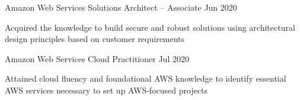 

\begin{cventries}

 \cventry
    {Amazon Web Services} %
    {Solutions Architect – Associate} %
    {} %
    {Jun 2020} %
    {
      \begin{cvitems} %
        \item {Acquired the knowledge to build secure and robust solutions using architectural design principles based on customer requirements}
      \end{cvitems}
    }

 \cventry
    {Amazon Web Services} %
    {Cloud Practitioner} %
    {} %
    {Jul 2020} %
    {
      \begin{cvitems} %
        \item {Attained cloud fluency and foundational AWS knowledge to identify essential AWS services necessary to set up AWS-focused projects}
      \end{cvitems}
    }

\end{cventries}